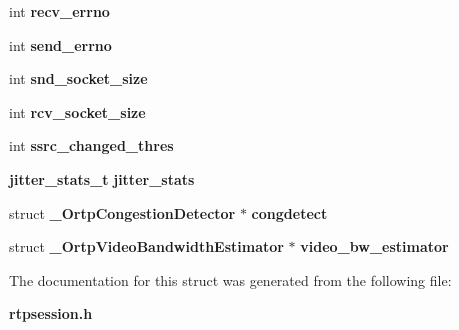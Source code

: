 \begin{DoxyCompactItemize}
int {\bfseries recv\+\_\+errno}
\item 
\mbox{\label{struct__RtpStream_a90d53ddb6ec2e58e4887285643fab3fe}} 
int {\bfseries send\+\_\+errno}
\item 
\mbox{\label{struct__RtpStream_aafd0c0ae9e6e80b1ccdd7ccab996b480}} 
int {\bfseries snd\+\_\+socket\+\_\+size}
\item 
\mbox{\label{struct__RtpStream_a5fd3587db51a3360389c2e42824125a0}} 
int {\bfseries rcv\+\_\+socket\+\_\+size}
\item 
\mbox{\label{struct__RtpStream_a9ede5d0113ef70ac01fd8286d53bada0}} 
int {\bfseries ssrc\+\_\+changed\+\_\+thres}
\item 
\mbox{\label{struct__RtpStream_a8a1df0e231e5ae2190502f69743bd5a4}} 
\textbf{ jitter\+\_\+stats\+\_\+t} {\bfseries jitter\+\_\+stats}
\item 
\mbox{\label{struct__RtpStream_ad3ee934b3a0fb64a8f86465386d0aa85}} 
struct \textbf{ \+\_\+\+Ortp\+Congestion\+Detector} $\ast$ {\bfseries congdetect}
\item 
\mbox{\label{struct__RtpStream_a22a7f6c4cfd83b3180f2e9bae807408c}} 
struct \textbf{ \+\_\+\+Ortp\+Video\+Bandwidth\+Estimator} $\ast$ {\bfseries video\+\_\+bw\+\_\+estimator}
\end{DoxyCompactItemize}


The documentation for this struct was generated from the following file\+:\begin{DoxyCompactItemize}
\item 
\textbf{ rtpsession.\+h}\end{DoxyCompactItemize}
